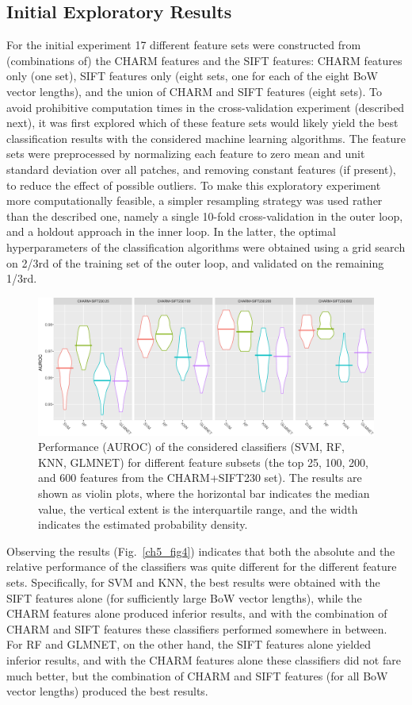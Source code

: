 \subsection{Initial Exploratory Results}
\label{subsec:initialExploratoryExperiments}
For the initial experiment 17 different feature sets were constructed from (combinations of) the CHARM features and the SIFT features: CHARM features only (one set), SIFT features only (eight sets, one for each of the eight BoW vector lengths), and the union of CHARM and SIFT features (eight sets). To avoid prohibitive computation times in the cross-validation experiment (described next), it was first explored which of these feature sets would likely yield the best classification results with the considered machine learning algorithms. The feature sets were preprocessed by normalizing each feature to zero mean and unit standard deviation over all patches, and removing constant features (if present), to reduce the effect of possible outliers. To make this exploratory experiment more computationally feasible, a simpler resampling strategy was used rather than the described one, namely a single 10-fold cross-validation in the outer loop, and a holdout approach in the inner loop. In the latter, the optimal hyperparameters of the classification algorithms were obtained using a grid search on 2/3rd of the training set of the outer loop, and validated on the remaining 1/3rd.
\begin{figure}[ht]
	\centering
	\includegraphics[width=\textwidth]{fig06}
	\caption{Performance (AUROC) of the considered classifiers (SVM, RF, KNN, GLMNET) for different feature subsets (the top 25, 100, 200, and 600 features from the CHARM+SIFT230 set). The results are shown as violin plots, where the horizontal bar indicates the median value, the vertical extent is the interquartile range, and the width indicates the estimated probability density.}
	\label{ch5_fig6}
\end{figure}
Observing the results (Fig.~\ref{ch5_fig4}) indicates that both the absolute and the relative performance of the classifiers was quite different for the different feature sets. Specifically, for SVM and KNN, the best results were obtained with the SIFT features alone (for sufficiently large BoW vector lengths), while the CHARM features alone produced inferior results, and with the combination of CHARM and SIFT features these classifiers performed somewhere in between. For RF and GLMNET, on the other hand, the SIFT features alone yielded inferior results, and with the CHARM features alone these classifiers did not fare much better, but the combination of CHARM and SIFT features (for all BoW vector lengths) produced the best results.


